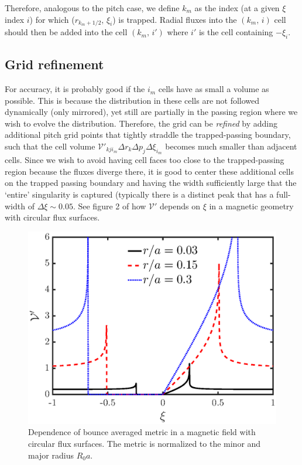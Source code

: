 \documentclass[11pt,a4paper]{article}
\begin{document}
Therefore, analogous to the pitch case, we define $k_m$ as the index (at a given $\xi$ index $i$) for which ($r_{k_m+1/2},\,\xi_i$) is trapped. Radial fluxes into the $(k_m,\,i)$ cell should then be added into the cell $(k_m,\,i')$ where $i'$ is the cell containing $-\xi_i$.

\subsection*{Grid refinement}
For accuracy, it is probably good if the $i_m$ cells have as small a volume as possible. This is because the distribution in these cells are not followed dynamically (only mirrored), yet still are partially in the passing region where we wish to evolve the distribution. Therefore, the grid can be \emph{refined} by adding additional pitch grid points that tightly straddle the trapped-passing boundary, such that the cell volume $\mathcal{V}'_{kji_m} \Delta r_k \Delta p_j \Delta \xi_{i_m}$ becomes much smaller than adjacent cells.  Since we wish to avoid having cell faces too close to the trapped-passing region because the fluxes diverge there, it is good to center these additional cells on the trapped passing boundary and having the width sufficiently large that the `entire' singularity is captured (typically there is a distinct peak that has a full-width of $\Delta \xi \sim 0.05$. See figure 2 of how $\mathcal{V}'$ depends on $\xi$ in a magnetic geometry with circular flux surfaces. 


\begin{figure}[H]
\begin{center}
\includegraphics[width=1.02\textwidth,trim=0 0 0 20mm]{trappedbc_VpPlot}
\caption{Dependence of bounce averaged metric in a magnetic field with circular flux surfaces. The metric is normalized to the minor and major radius $R_0a$.}
\end{center}
\end{figure}
\end{document}

